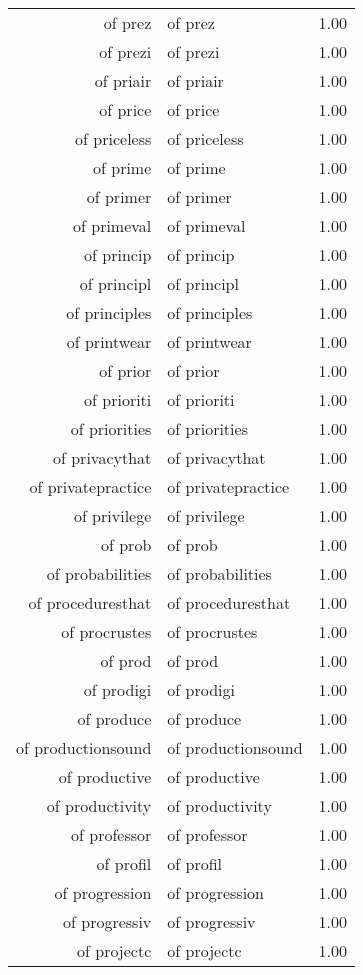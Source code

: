 \begin{table}[ht]
\begin{tabular}{rlr}
  of prez & of prez & 1.00 \\ 
  of prezi & of prezi & 1.00 \\ 
  of priair & of priair & 1.00 \\ 
  of price & of price & 1.00 \\ 
  of priceless & of priceless & 1.00 \\ 
  of prime & of prime & 1.00 \\ 
  of primer & of primer & 1.00 \\ 
  of primeval & of primeval & 1.00 \\ 
  of princip & of princip & 1.00 \\ 
  of principl & of principl & 1.00 \\ 
  of principles & of principles & 1.00 \\ 
  of printwear & of printwear & 1.00 \\ 
  of prior & of prior & 1.00 \\ 
  of prioriti & of prioriti & 1.00 \\ 
  of priorities & of priorities & 1.00 \\ 
  of privacythat & of privacythat & 1.00 \\ 
  of privatepractice & of privatepractice & 1.00 \\ 
  of privilege & of privilege & 1.00 \\ 
  of prob & of prob & 1.00 \\ 
  of probabilities & of probabilities & 1.00 \\ 
  of proceduresthat & of proceduresthat & 1.00 \\ 
  of procrustes & of procrustes & 1.00 \\ 
  of prod & of prod & 1.00 \\ 
  of prodigi & of prodigi & 1.00 \\ 
  of produce & of produce & 1.00 \\ 
  of productionsound & of productionsound & 1.00 \\ 
  of productive & of productive & 1.00 \\ 
  of productivity & of productivity & 1.00 \\ 
  of professor & of professor & 1.00 \\ 
  of profil & of profil & 1.00 \\ 
  of progression & of progression & 1.00 \\ 
  of progressiv & of progressiv & 1.00 \\ 
  of projectc & of projectc & 1.00 \\ 

\end{tabular}
\end{table}
